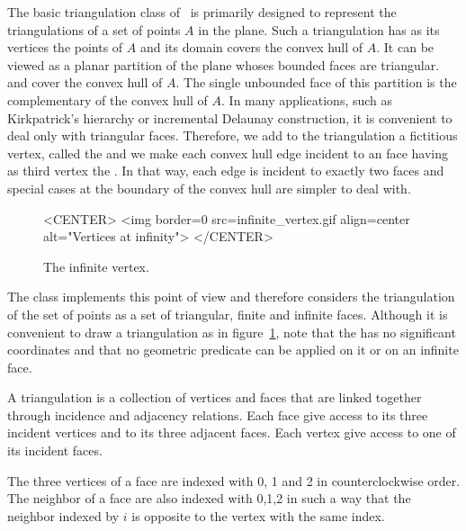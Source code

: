 The basic triangulation class 
 of \cgal\ is primarily designed to represent the  triangulations
 of a set of points ${  A}$ in the plane.
Such a triangulation has as its vertices the points of ${  A}$
and its domain covers the convex hull of ${  A}$.
It can be viewed as a planar partition of the plane
whoses bounded faces are triangular. and cover
the convex hull of ${  A}$. The single unbounded face of this partition
is the complementary of the convex hull of ${  A}$. 
In many applications, such as Kirkpatrick's hierarchy
or incremental Delaunay construction, it is convenient to
deal only with triangular faces. Therefore, we add to the
triangulation
a fictitious vertex, called the 
and we make each  convex hull edge incident 
to an  
face having as third vertex  the .
 In that way, each edge is incident to exactly two faces
and special cases at the
boundary of the convex hull are simpler to deal with.



\begin{figure}
\begin{ccTexOnly}
\begin{center}   \end{center}
\end{ccTexOnly}
\caption{The infinite vertex.
\label{I1_Fig_infinite_vertex}}
\begin{ccHtmlOnly}
<CENTER>
<img border=0 src=infinite_vertex.gif align=center alt="Vertices at
infinity">
</CENTER>
\end{ccHtmlOnly}
\end{figure}


The class 
implements this point of view
and therefore considers  the triangulation of the set of points 
as a set of  triangular,  finite and
infinite faces. 
Although it is convenient to draw a triangulation as in
figure~\ref{I1_Fig_infinite_vertex}, note that
the  has no significant
coordinates and that no geometric predicate can be applied on it
or on an infinite face.

A triangulation is a collection of vertices and faces that
are linked together through incidence and adjacency relations.
Each face give access to its three incident vertices and to
its 
three adjacent faces. Each vertex give access to one of its  incident
faces. 

The three vertices of a face are indexed with 0, 1 and 2
in counterclockwise order. The neighbor of a face are also 
indexed with 0,1,2 in such a way that the neighbor indexed by $i$
is opposite to the vertex with the same index.


